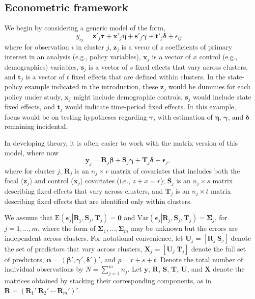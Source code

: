 \documentclass[12pt]{article}
\newcommand{\E}{\text{E}}
\newcommand{\Var}{\text{Var}}
\newcommand{\bm}{\mathbf}
\newcommand{\bs}{\boldsymbol}
\begin{document}

\subsection{Econometric framework}

We begin by considering a generic model of the form,
\begin{equation}
\label{eq:fixed_effects_ij}
\ {y}_{ij} = \bm{z}'_j \bs\tau + \bm{x}'_j\bs\eta + \bm{s}'_j \bs\gamma + \bm{t}'_j \bs\delta + \epsilon_{ij} 
\end{equation}
where for observation $i$ in cluster $j$, $\bm{z}_j$ is a vecor of $z$ coefficients of primary interest in an analysis (e.g., policy variables), $\bm{x}_j$ is a vector of $x$ control (e.g., demographics) variables, $\bm{s}_j$ is a vector of $s$ fixed effects that vary across clusters, and $\bm{t}_j$ is a vector of $t$ fixed effects that are defined within clusters. In the state-policy example indicated in the introduction, these $\bm{z}_j$ would be dummies for each policy under study, $\bm{x}_j$ might include demographic controls, $\bm{s}_j$ would include state fixed effects, and $\bm{t}_j$ would indicate time-period fixed effects. In this example, focus would be on testing hypotheses regarding $\bs \tau$, with estimation of $\bs\eta$, $\bs\gamma$, and $\bs\delta$ remaining incidental. 

In developing theory, it is often easier to work with the matrix version of this model, where now
\begin{equation}
\label{eq:fixed_effects}
\bm{y}_j = \bm{R}_j \bs\beta + \bm{S}_j \bs\gamma + \bm{T}_j \bs\delta + \bs\epsilon_j,
\end{equation}
where for cluster $j$, $\bm{R}_j$ is an $n_j \times r$ matrix of covariates that includes both the focal ($\bm{z}_j$) and control ($\bm{x}_j$) covariates (i.e., $z + x = r$); $\bm{S}_j$ is an $n_j \times s$ matrix describing fixed effects that vary across clusters, and $\bm{T}_j$ is an $n_j \times t$ matrix describing fixed effects that are identified only within clusters. 

We assume that $\E\left(\bs\epsilon_j\left|\bm{R}_j,\bm{S}_j, \bm{T}_j\right.\right) = \bm{0}$ and $\Var\left(\bs\epsilon_j\left|\bm{R}_j,\bm{S}_j,\bm{T}_j\right.\right) = \bs\Sigma_j$, for $j = 1,...,m$, where the form of $\bs\Sigma_1,...,\bs\Sigma_m$ may be unknown but the errors are independent across clusters. 
For notational convenience, let $\bm{U}_j = \left[\bm{R}_j \ \bm{S}_j \right]$ denote the set of predictors that vary across clusters, $\bm{X}_j = \left[\bm{U}_j \ \bm{T}_j \right]$ denote the full set of predictors, $\bs\alpha = \left(\bs\beta', \bs\gamma', \bs\delta' \right)'$, and $p = r + s + t$.
Denote the total number of individual observations by $N = \sum_{j=1}^m n_j$.
Let $\bm{y}$, $\bm{R}$, $\bm{S}$, $\bm{T}$, $\bm{U}$, and $\bm{X}$ denote the matrices obtained by stacking their corresponding components, as in $\bm{R} = \left(\bm{R}_1' \ \bm{R}_2' \ \cdots \ \bm{R}_m'\right)'$. 
\end{document}
